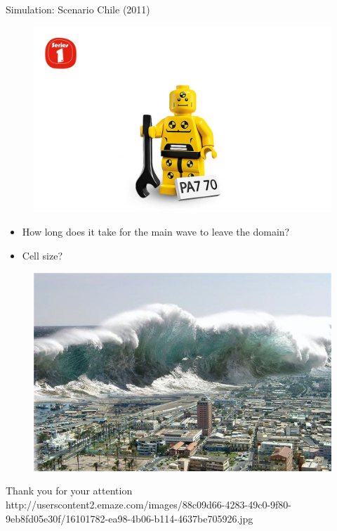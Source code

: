 \documentclass[shortpres]{beamer}
\newcommand{\imgfullscale}{0.75}
\begin{document}
\begin{frame}{Simulation: Scenario Chile (2011)}
	\begin{figure}
		\includegraphics[width=\imgfullscale\linewidth]{img/dummy_image.jpg}
	\end{figure}
	\begin{itemize}
		\item How long does it take for the main wave to leave the domain?
		\item Cell size?
	\end{itemize}
\end{frame}	
	
\begin{frame}{}
	\begin{figure}
		\includegraphics[clip, width=\imgfullscale\linewidth]{img/tsunami.jpg}
	\end{figure}
	\centering
	Thank you for your attention
	\\
	\vfill
	\flushleft
	{\fontsize{5}{5} \selectfont http://userscontent2.emaze.com/images/88c09d66-4283-49c0-9f80-9eb8fd05e30f/16101782-ea98-4b06-b114-4637be705926.jpg}
\end{frame}
\end{document}
